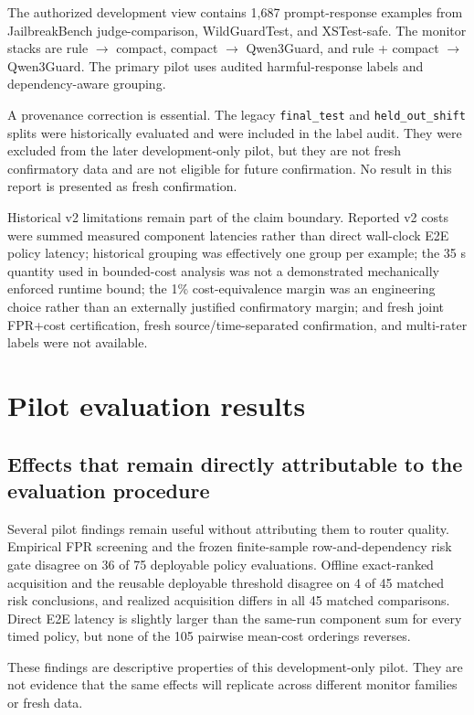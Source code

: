 \documentclass[11pt]{article}
\begin{document}
The authorized development view contains 1,687 prompt-response examples from JailbreakBench judge-comparison, WildGuardTest, and XSTest-safe. The monitor stacks are rule $\rightarrow$ compact, compact $\rightarrow$ Qwen3Guard, and rule + compact $\rightarrow$ Qwen3Guard. The primary pilot uses audited harmful-response labels and dependency-aware grouping.

A provenance correction is essential. The legacy \texttt{final\_test} and \texttt{held\_out\_shift} splits were historically evaluated and were included in the label audit. They were excluded from the later development-only pilot, but they are not fresh confirmatory data and are not eligible for future confirmation. No result in this report is presented as fresh confirmation.

Historical v2 limitations remain part of the claim boundary. Reported v2 costs were summed measured component latencies rather than direct wall-clock E2E policy latency; historical grouping was effectively one group per example; the 35 s quantity used in bounded-cost analysis was not a demonstrated mechanically enforced runtime bound; the 1\% cost-equivalence margin was an engineering choice rather than an externally justified confirmatory margin; and fresh joint FPR+cost certification, fresh source/time-separated confirmation, and multi-rater labels were not available.

\section{Pilot evaluation results}
\subsection{Effects that remain directly attributable to the evaluation procedure}
Several pilot findings remain useful without attributing them to router quality. Empirical FPR screening and the frozen finite-sample row-and-dependency risk gate disagree on 36 of 75 deployable policy evaluations. Offline exact-ranked acquisition and the reusable deployable threshold disagree on 4 of 45 matched risk conclusions, and realized acquisition differs in all 45 matched comparisons. Direct E2E latency is slightly larger than the same-run component sum for every timed policy, but none of the 105 pairwise mean-cost orderings reverses.

These findings are descriptive properties of this development-only pilot. They are not evidence that the same effects will replicate across different monitor families or fresh data.
\end{document}
